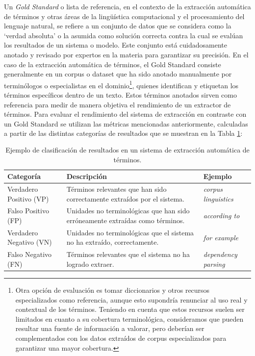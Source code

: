 Un \textit{Gold Standard} o lista de referencia, en el contexto de la extracción automática de términos y otras áreas de la lingüística computacional y el procesamiento del lenguaje natural, se refiere a un conjunto de datos que se considera como la ‘verdad absoluta’ o la asumida como solución correcta contra la cual se evalúan los resultados de un sistema o modelo. Este conjunto está cuidadosamente anotado y revisado por expertos en la materia para garantizar su precisión. En el caso de la extracción automática de términos, el Gold Standard consiste generalmente en un corpus o dataset que ha sido anotado manualmente por terminólogos o especialistas en el dominio\footnote{  Otra opción de evaluación es tomar diccionarios y otros recursos especializados como referencia, aunque esto supondría renunciar al uso real y contextual de los términos. Teniendo en cuenta que estos recursos suelen ser limitados en cuanto a su cobertura terminológica, consideramos que pueden resultar una fuente de información a valorar, pero deberían ser complementados con los datos extraídos de corpus especializados para garantizar una mayor cobertura.
}, quienes identifican y etiquetan los términos específicos dentro de un texto. Estos términos anotados sirven como referencia para medir de manera objetiva el rendimiento de un extractor de términos. Para evaluar el rendimiento del sistema de extracción en contraste con un Gold Standard se utilizan las métricas mencionadas anteriormente, calculadas a partir de las distintas categorías de resultados que se muestran en la Tabla \ref{tab:clasificacion_resultados}:

\begin{table}[ht]
\centering
\fontsize{10}{12}\selectfont
\begin{tabular}{l p{7cm} l}
\toprule
\textbf{Categoría} & \textbf{Descripción} & \textbf{Ejemplo} \\
\midrule
Verdadero Positivo (VP) & Términos relevantes que han sido correctamente extraídos por el sistema. & \textit{corpus linguistics} \\
Falso Positivo (FP) & Unidades no terminológicas que han sido erróneamente extraídas como términos. & \textit{according to} \\
Verdadero Negativo (VN) & Unidades no terminológicas que el sistema no ha extraído, correctamente. & \textit{for example} \\
Falso Negativo (FN) & Términos relevantes que el sistema no ha logrado extraer. & \textit{dependency parsing} \\
\bottomrule
\end{tabular}
\caption{Ejemplo de clasificación de resultados en un sistema de extracción automática de términos.}
\label{tab:clasificacion_resultados}
\end{table}


